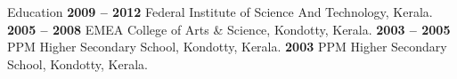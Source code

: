 \documentclass{resume}
\begin{document}

\begin{category}{Education}
   \hfill \textbf{2009 -- 2012}
  \citemnobullet Federal Institute of Science And Technology, Kerala.
   \hfill \textbf{2005 -- 2008}
  \citemnobullet  EMEA College of Arts \& Science, Kondotty, Kerala.
   \hfill \textbf{2003 -- 2005}
  \citemnobullet PPM Higher Secondary School, Kondotty, Kerala.
   \hfill \textbf{2003}
  \citemnobullet PPM Higher Secondary School, Kondotty, Kerala.\end{category}
  



\end{document}
